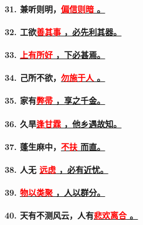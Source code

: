 \documentclass[UTF8]{ctexart} %
\begin{document}
\paragraph{31. 兼听则明，\uline{\quad \textcolor{red}{偏}\textcolor{red}{信}\textcolor{red}{则}\textcolor{red}{暗} \quad。}}
\paragraph{32. 工欲\uline{\quad \textcolor{red}{善}\textcolor{red}{其}\textcolor{red}{事} \quad ，必先利其器。}}
\paragraph{33. \uline{\quad \textcolor{red}{上}\textcolor{red}{有}\textcolor{red}{所}\textcolor{red}{好} \quad ，下必甚焉。}}
\paragraph{34. 己所不欲，\uline{\quad \textcolor{red}{勿}\textcolor{red}{施}\textcolor{red}{于}\textcolor{red}{人} \quad 。}}
\paragraph{35. 家有\uline{\quad \textcolor{red}{弊}\textcolor{red}{帚} \quad ，享之千金。}}
\paragraph{36. 久旱\uline{\quad \textcolor{red}{逢}\textcolor{red}{甘}\textcolor{red}{霖} \quad，他乡遇故知。}}
\paragraph{37. 蓬生麻中，\uline{\quad \textcolor{red}{不}\textcolor{red}{扶} \quad 而直。}}
\paragraph{38. 人无 \uline{\quad \textcolor{red}{远}\textcolor{red}{虑} \quad ，必有近忧。}}
\paragraph{39. \uline{\quad \textcolor{red}{物}\textcolor{red}{以}\textcolor{red}{类}\textcolor{red}{聚} \quad，人以群分。}}
\paragraph{40. 天有不测风云，人有\uline{\quad \textcolor{red}{悲}\textcolor{red}{欢}\textcolor{red}{离}\textcolor{red}{合} \quad。}}
\end{document}
